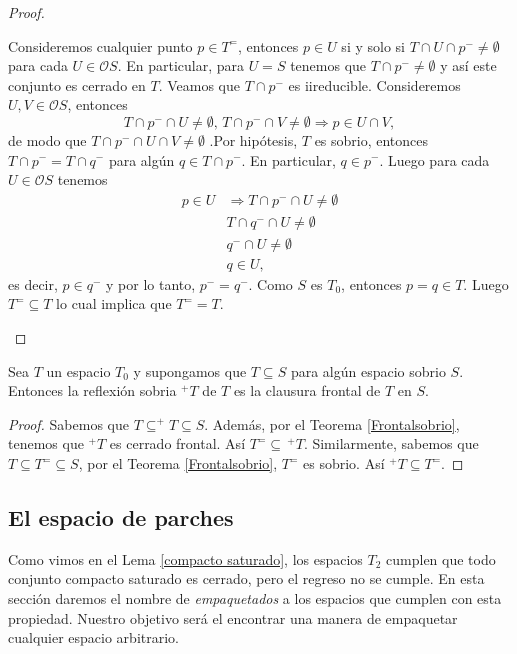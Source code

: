 \begin{proof}
\begin{description}
    Consideremos cualquier punto $p\in T^=$, entonces $p\in U$ si y solo si $T\cap U\cap p^-\neq \emptyset$ para cada $U\in \mathcal{O}S$. En particular, para $U=S$ tenemos que $T\cap p^-\neq \emptyset$ y así este conjunto es cerrado en $T$. Veamos que  $T\cap p^-$ es iireducible. Consideremos $U, V\in \mathcal{O}S$, entonces
    \[
    T\cap p^-\cap U\neq \emptyset,\, T\cap p^-\cap V\neq \emptyset \Rightarrow p\in U\cap V,
    \]
    de modo que $T\cap p^-\cap U\cap V\neq \emptyset$ .Por hipótesis, $T$ es sobrio, entonces $T\cap p^-=T\cap q^-$ para algún $q\in T\cap p^-$. En particular, $q\in p^-$. Luego para cada $U\in \mathcal{O}S$ tenemos 
    \[
    \begin{split}
        p\in U & \Rightarrow T\cap p^-\cap U\neq \emptyset\\
        & T\cap q^- \cap U\neq \emptyset\\
        & q^-\cap U\neq \emptyset\\
        & q\in U,
    \end{split}
    \]
    es decir, $p\in q^-$ y por lo tanto, $p^-=q^-$. Como $S$ es $T_0$, entonces $p=q\in T$. Luego $T^=\subseteq T$ lo cual implica que $T^==T$.
\end{description}
\end{proof}

\begin{cor}
    Sea $T$ un espacio $T_0$ y supongamos que $T\subseteq S$ para algún espacio sobrio $S$. Entonces la reflexión sobria $^+T$ de $T$ es la clausura frontal de $T$ en $S$.
\end{cor}

\begin{proof}
    Sabemos que $T\subseteq ^+ T\subseteq S$. Además, por el Teorema \ref{Frontalsobrio}, tenemos que $^+T$ es cerrado frontal. Así $T^=\subseteq\, ^+T$. Similarmente, sabemos que $T\subseteq T^=\subseteq S$, por el Teorema \ref{Frontalsobrio}, $T^=$ es sobrio. Así $^+T\subseteq T^=$.
\end{proof}

\subsection{El espacio de parches}\label{Parche puntos}

Como vimos en el Lema \ref{compacto saturado}, los espacios $T_2$ cumplen que todo conjunto compacto saturado es cerrado, pero el regreso no se cumple.  En esta sección daremos el nombre de \emph{empaquetados} a los espacios que cumplen con esta propiedad. Nuestro objetivo será el encontrar una manera de empaquetar cualquier espacio arbitrario.

